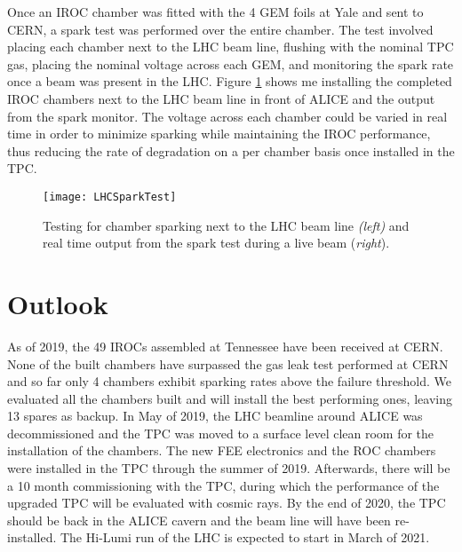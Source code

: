 Once an IROC chamber was fitted with the 4 GEM foils at Yale and sent to CERN, a spark test was performed over the entire chamber.  The test involved placing each chamber next to the LHC beam line, flushing with the nominal TPC gas, placing the nominal voltage across each GEM, and monitoring the spark rate once a beam was present in the LHC.   Figure \ref{fig:LHCspark} shows me installing the completed IROC chambers next to the LHC beam line in front of ALICE and the output from the spark monitor.  The voltage across each chamber could be varied in real time in order to minimize sparking while maintaining the IROC performance, thus reducing the rate of degradation on a per chamber basis once installed in the TPC.


\begin{figure}[t!]
\texttt{[image: LHCSparkTest]}
\centering
\caption{Testing for chamber sparking next to the LHC beam line \textit{(left)} and real time output from the spark test during a live beam (\textit{right}). }
\label{fig:LHCspark}
\end{figure}

\section{Outlook}

As of 2019, the 49 IROCs assembled at Tennessee have been received at CERN.  None of the built chambers have surpassed the gas leak test performed at CERN and so far only 4 chambers exhibit sparking rates above the failure threshold.  We evaluated all the chambers built and will install the best performing ones, leaving 13 spares as backup.  In May of 2019, the LHC beamline around ALICE was decommissioned and the TPC was moved to a surface level clean room for the installation of the chambers.  The new FEE electronics and the ROC chambers were installed in the TPC through the summer of 2019.  Afterwards, there will be a 10 month commissioning with the TPC, during which the performance of the upgraded TPC will be evaluated with cosmic rays.  By the end of 2020, the TPC should be back in the ALICE cavern and the beam line will have been re-installed.  The Hi-Lumi run of the LHC is expected to start in March of 2021.





